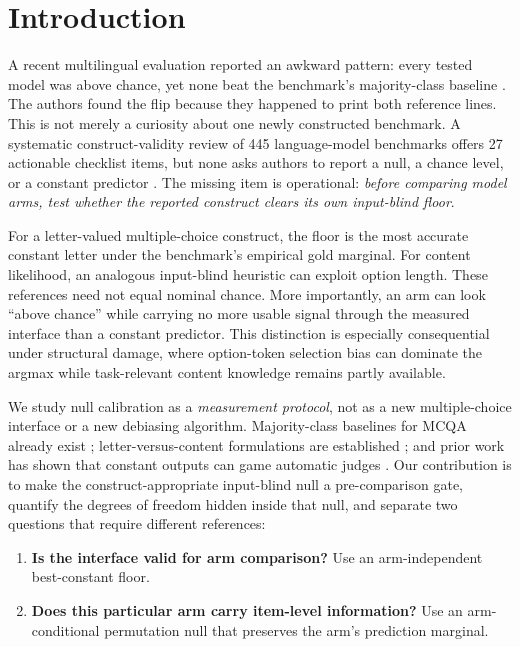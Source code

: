 \section{Introduction}

A recent multilingual evaluation reported an awkward pattern: every tested model was above chance, yet none beat the benchmark's majority-class baseline \citep{arcon2026metalinguistic}. The authors found the flip because they happened to print both reference lines. This is not merely a curiosity about one newly constructed benchmark. A systematic construct-validity review of 445 language-model benchmarks offers 27 actionable checklist items, but none asks authors to report a null, a chance level, or a constant predictor \citep{bean2025measuring}. The missing item is operational: \emph{before comparing model arms, test whether the reported construct clears its own input-blind floor}.

For a letter-valued multiple-choice construct, the floor is the most accurate constant letter under the benchmark's empirical gold marginal. For content likelihood, an analogous input-blind heuristic can exploit option length. These references need not equal nominal chance. More importantly, an arm can look ``above chance'' while carrying no more usable signal through the measured interface than a constant predictor. This distinction is especially consequential under structural damage, where option-token selection bias \citep{zheng2024selectors} can dominate the argmax while task-relevant content knowledge remains partly available.

We study null calibration as a \emph{measurement protocol}, not as a new multiple-choice interface or a new debiasing algorithm. Majority-class baselines for MCQA already exist \citep{balepur2024artifacts}; letter-versus-content formulations are established \citep{gu2025olmes,cho2026choices}; and prior work has shown that constant outputs can game automatic judges \citep{zheng2025cheating}. Our contribution is to make the construct-appropriate input-blind null a pre-comparison gate, quantify the degrees of freedom hidden inside that null, and separate two questions that require different references:

\begin{enumerate}[leftmargin=*,nosep]
    \item \textbf{Is the interface valid for arm comparison?} Use an arm-independent best-constant floor.
    \item \textbf{Does this particular arm carry item-level information?} Use an arm-conditional permutation null that preserves the arm's prediction marginal.
\end{enumerate}

